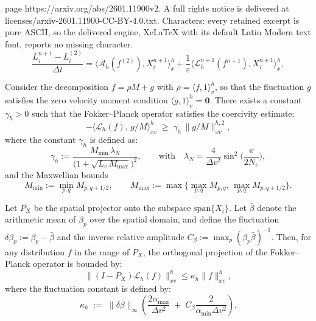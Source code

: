 \documentclass[10pt,a4paper]{amsart}
\newcommand{\modifyfirst}[1]{#1}
\begin{document}
page https://arxiv.org/abs/2601.11900v2. A full rights notice is delivered at licenses/arxiv-2601.11900-CC-BY-4.0.txt. Characters: every retained excerpt is pure ASCII, so the delivered engine, XeLaTeX with its default Latin Modern text font, reports no missing character.
\begin{equation}\label{eq:L_fd_imex}
  \frac{L_{i}^{n+1} - L_{i}^{(2)}}{\Delta t} = \langle \mathcal{A}_h(f^{(2)}), X_{i}^{n+1}\rangle_x^h + \frac{1}{\varepsilon}\langle \mathcal{L}_h^{n+1}(f^{n+1}), X_{i}^{n+1}\rangle_x^h,
\end{equation}

\begin{proposition}
\label{prop:coercivity}
Consider the decomposition $f = \rho M + g$ \modifyfirst{with $\rho=\langle f,1\rangle_v^h$, so that the fluctuation $g$ satisfies the zero velocity moment condition $\langle g, 1 \rangle_v^h = \mathbf{0}$}. There exists a constant $\gamma_h > 0$ such that the Fokker--Planck operator satisfies the coercivity estimate:
\begin{equation}
  -\big\langle \mathcal L_{h}(f),\, g/M \big\rangle_{xv}^h \;\ge\; \gamma_h\,\big\| g/M \big\|_{xv}^{h,2},
\end{equation}
where the constant $\gamma_h$ is defined as:
\begin{equation}
  \gamma_h:=\frac{M_{\min}\,\lambda_N}{\Big(1+\sqrt{{L_v\,M_{\max}}}\Big)^2}, \qquad \text{with} \quad \lambda_N=\frac{4}{\Delta v^2}\sin^2\!\Big(\frac{\pi}{2N_v}\Big),
\end{equation}
and the Maxwellian bounds
\[
  M_{\min}:=\min_{p,q} M_{p,q+1/2},
  \qquad
  M_{\max}:=\max\!\Big\{ \max_{p,q} M_{p,q},\, \max_{p,q} M_{p,q+1/2}\Big\}.
\]
\end{proposition}

\begin{proposition}
\label{prop:fluctuation_bound}
Let $P_X$ be the spatial projector onto the subspace $\mathrm{span}\{X_i\}$. Let $\bar{\beta}$ denote the arithmetic mean of $\beta_p$ over the spatial domain, and define the fluctuation $\delta \beta_p := \beta_p - \bar{\beta}$ and the inverse relative amplitude $C_\beta := \max_p (\beta_p \bar{\beta})^{-1}$.
Then, for any distribution $f$ in the range of $P_X$, the orthogonal projection of the Fokker--Planck operator is bounded by:
\begin{equation}
  \|(I-P_X)\mathcal L_{h}(f)\|_{xv}^h \le \kappa_h \|f\|_{xv}^h,
\end{equation}
where the fluctuation constant is defined by:
\begin{equation}\label{eq:kappa_h_def}
  \kappa_h \;:=\; \|\delta \beta\|_\infty \left( \frac{2\alpha_{\max}}{\Delta v^2} \;+\; C_\beta \frac{2}{\alpha_{\min}\Delta v^2} \right).
\end{equation}
\end{proposition}
\end{document}
